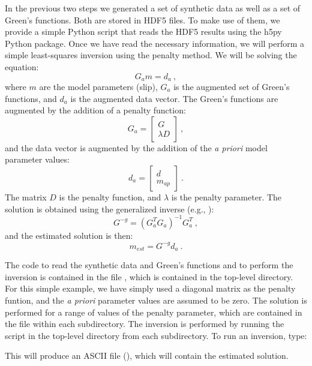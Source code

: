 In the previous two steps we generated a set of synthetic data as
well as a set of Green's functions. Both are stored in HDF5 files.
To make use of them, we provide a simple Python script that reads
the HDF5 results using the h5py Python package. Once we have read
the necessary information, we will perform a simple least-squares
inversion using the penalty method. We will be solving the equation:
\begin{equation}
G_{a}m=d_{a}\:,
\end{equation}
where $m$ are the model parameters (slip), $G_{a}$ is the augmented
set of Green's functions, and $d_{a}$ is the augmented data vector.
The Green's functions are augmented by the addition of a penalty function:
\begin{equation}
G_{a}=\left[\begin{array}{c}
G\\
\lambda D
\end{array}\right]\:,
\end{equation}
and the data vector is augmented by the addition of the \textit{a
priori} model parameter values:
\begin{equation}
d_{a}=\left[\begin{array}{c}
d\\
m_{ap}
\end{array}\right]\:.
\end{equation}
The matrix $D$ is the penalty function, and $\lambda$ is the penalty
parameter. The solution is obtained using the generalized inverse
(e.g., \cite{Menke:1984}):
\begin{equation}
G^{-g}=\left(G_{a}^{T}G_{a}\right)^{-1}G_{a}^{T}\:,
\end{equation}
and the estimated solution is then:
\begin{equation}
m_{est}=G^{-g}d_{a}\:.
\end{equation}


The code to read the synthetic data and Green's functions and to perform
the inversion is contained in the file , which
is contained in the top-level directory. For this simple example,
we have simply used a diagonal matrix as the penalty funtion, and
the \textit{a priori} parameter values are assumed to be zero. The
solution is performed for a range of values of the penalty parameter,
which are contained in the file  within
each subdirectory. The inversion is performed by running the script
in the top-level directory from each subdirectory. To run an inversion,
type:
This will produce an ASCII file (\filename{slip\_inverted.txt}), which
will contain the estimated solution.



